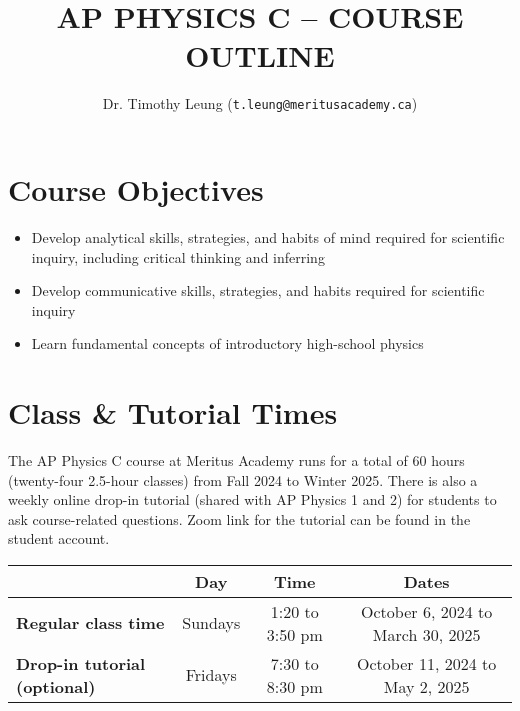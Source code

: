 \documentclass{../../oss-handout}
\title{AP PHYSICS C -- COURSE OUTLINE}
\author{Dr. Timothy Leung (\texttt{t.leung@meritusacademy.ca})}
\begin{document}
\thispagestyle{title}
\gentitle


\section{Course Objectives}
\begin{itemize}[nosep]
\item Develop analytical skills, strategies, and habits of mind required for
  scientific inquiry, including critical thinking and inferring
\item Develop communicative skills, strategies, and habits required for
  scientific inquiry
\item Learn fundamental concepts of introductory high-school physics
\end{itemize}






\section{Class \& Tutorial Times}
The AP Physics C course at Meritus Academy runs for a total of 60 hours
(twenty-four 2.5-hour classes)
from Fall 2024 to Winter 2025. There is also a weekly online
drop-in tutorial (shared with AP Physics 1 and 2) for students to ask
course-related questions. Zoom link for the tutorial can be found in the
student account.

\bgroup
\def\arraystretch{1.25}
\begin{tabular}{|p{1.9in}|c|c|c|}
  \rowcolor{lightgray}
  \hline
  & \textbf{Day} & \textbf{Time} & \textbf{Dates} \\
  \hline\hline
  
  \textbf{Regular class time} &
  \hspace{.1in}Sundays\hspace{.1in} &
  \hspace{.1in}1:20 to 3:50 pm\hspace{.1in} &
  October 6, 2024 to March 30, 2025 \\
  \hline
  
  \textbf{Drop-in tutorial (optional)} &
  Fridays & 7:30 to 8:30 pm &  October 11, 2024 to May 2, 2025 \\
  \hline
\end{tabular}
\egroup
\end{document}
